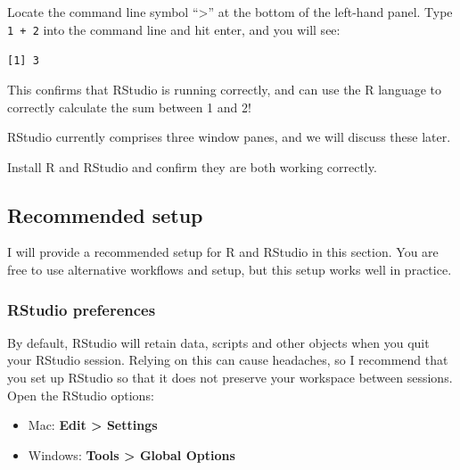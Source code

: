 \documentclass[
  a4paper,
]{memoir}
\begin{document}
Locate the command line symbol ``\textgreater{}'' at the bottom of the
left-hand panel. Type \texttt{1\ +\ 2} into the command line and hit
enter, and you will see:

\texttt{{[}1{]}\ 3}

This confirms that RStudio is running correctly, and can use the R
language to correctly calculate the sum between 1 and 2!

RStudio currently comprises three window panes, and we will discuss
these later.

\begin{tcolorbox}[enhanced jigsaw, title={TASK}, opacitybacktitle=0.6, colbacktitle=quarto-callout-note-color!10!white, titlerule=0mm, colframe=quarto-callout-note-color-frame, opacityback=0, left=2mm, breakable, bottomtitle=1mm, coltitle=black, bottomrule=.15mm, arc=.35mm, rightrule=.15mm, toptitle=1mm, colback=white, toprule=.15mm, leftrule=.75mm]

Install R and RStudio and confirm they are both working correctly.

\end{tcolorbox}

\hypertarget{recommended-setup}{%
\subsection{Recommended setup}\label{recommended-setup}}

I will provide a recommended setup for R and RStudio in this section.
You are free to use alternative workflows and setup, but this setup
works well in practice.

\hypertarget{rstudio-preferences}{%
\subsubsection{RStudio preferences}\label{rstudio-preferences}}

By default, RStudio will retain data, scripts and other objects when you
quit your RStudio session. Relying on this can cause headaches, so I
recommend that you set up RStudio so that it does not preserve your
workspace between sessions. Open the RStudio options:

\begin{itemize}
\item
  Mac: \textbf{Edit \textgreater{} Settings}
\item
  Windows: \textbf{Tools \textgreater{} Global Options}
\end{itemize}
\end{document}
